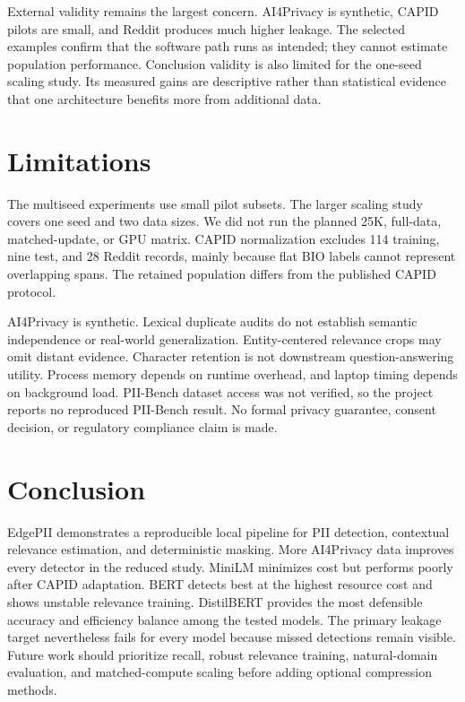 \documentclass[conference]{IEEEtran}
\begin{document}
External validity remains the largest concern. AI4Privacy is synthetic, CAPID pilots are small, and Reddit produces much higher leakage. The selected examples confirm that the software path runs as intended; they cannot estimate population performance. Conclusion validity is also limited for the one-seed scaling study. Its measured gains are descriptive rather than statistical evidence that one architecture benefits more from additional data.

\section{Limitations}
The multiseed experiments use small pilot subsets. The larger scaling study covers one seed and two data sizes. We did not run the planned 25K, full-data, matched-update, or GPU matrix. CAPID normalization excludes 114 training, nine test, and 28 Reddit records, mainly because flat BIO labels cannot represent overlapping spans. The retained population differs from the published CAPID protocol.

AI4Privacy is synthetic. Lexical duplicate audits do not establish semantic independence or real-world generalization. Entity-centered relevance crops may omit distant evidence. Character retention is not downstream question-answering utility. Process memory depends on runtime overhead, and laptop timing depends on background load. PII-Bench dataset access was not verified, so the project reports no reproduced PII-Bench result. No formal privacy guarantee, consent decision, or regulatory compliance claim is made.

\section{Conclusion}
EdgePII demonstrates a reproducible local pipeline for PII detection, contextual relevance estimation, and deterministic masking. More AI4Privacy data improves every detector in the reduced study. MiniLM minimizes cost but performs poorly after CAPID adaptation. BERT detects best at the highest resource cost and shows unstable relevance training. DistilBERT provides the most defensible accuracy and efficiency balance among the tested models. The primary leakage target nevertheless fails for every model because missed detections remain visible. Future work should prioritize recall, robust relevance training, natural-domain evaluation, and matched-compute scaling before adding optional compression methods.
\end{document}
